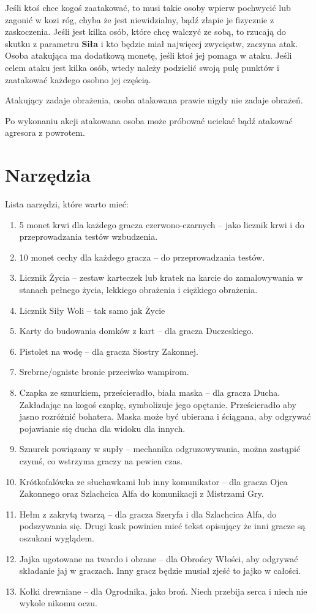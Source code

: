 	Jeśli ktoś chce kogoś zaatakować, to musi takie osoby wpierw pochwycić lub zagonić w kozi róg, chyba że jest niewidzialny, bądź złapie je fizycznie z zaskoczenia.
	Jeśli jest kilka osób, które chcę walczyć ze sobą, to rzucają do skutku z parametru \textbf{Siła} i kto będzie miał najwięcej zwycięstw, zaczyna atak.
	Osoba atakująca ma dodatkową monetę, jeśli ktoś jej pomaga w ataku.
	Jeśli celem ataku jest kilka osób, wtedy należy podzielić swoją pulę punktów i zaatakować każdego osobno jej częścią.
	
	Atakujący zadaje obrażenia, osoba atakowana prawie nigdy nie zadaje obrażeń.
	
	Po wykonaniu akcji atakowana osoba może próbować uciekać bądź atakować agresora z powrotem.

\section{Narzędzia}
	Lista narzędzi, które warto mieć:
	\begin{enumerate}
		\item 5 monet krwi dla każdego gracza czerwono-czarnych -- jako licznik krwi i do przeprowadzania testów wzbudzenia.
		\item 10 monet cechy dla każdego gracza -- do przeprowadzania testów.
		\item Licznik Życia -- zestaw karteczek lub kratek na karcie do zamalowywania w stanach pełnego życia, lekkiego obrażenia i ciężkiego obrażenia.
		\item Licznik Siły Woli -- tak samo jak Życie
		\item Karty do budowania domków z kart -- dla gracza Duczeskiego.
		\item Pistolet na wodę -- dla gracza Siostry Zakonnej.
		\item Srebrne/ogniste bronie przeciwko wampirom.
		\item Czapka ze sznurkiem, prześcieradło, biała maska -- dla gracza Ducha. Zakładając na kogoś czapkę, symbolizuje jego opętanie.
			Prześcieradło aby jasno rozróżnić bohatera. Maska może być ubierana i ściągana, aby odgrywać pojawianie się ducha dla widoku dla innych.
		\item Sznurek powiązany w supły -- mechanika odgruzowywania, można zastąpić czymś, co wstrzyma graczy na pewien czas.
		\item Krótkofalówka ze słuchawkami lub inny komunikator -- dla gracza Ojca Zakonnego oraz Szlachcica Alfa do komunikacji z Mistrzami Gry.
		\item Hełm z zakrytą twarzą -- dla gracza Szeryfa i dla Szlachcica Alfa, do podszywania się.
			Drugi kask powinien mieć tekst opisujący że inni gracze są oszukani wyglądem.
		\item Jajka ugotowane na twardo i obrane -- dla Obrońcy Włości, aby odgrywać składanie jaj w graczach. Inny gracz będzie musiał zjeść to jajko w całości.
		\item Kołki drewniane -- dla Ogrodnika, jako broń. Niech przebija serca i niech nie wykole nikomu oczu.
	\end{enumerate}
	
